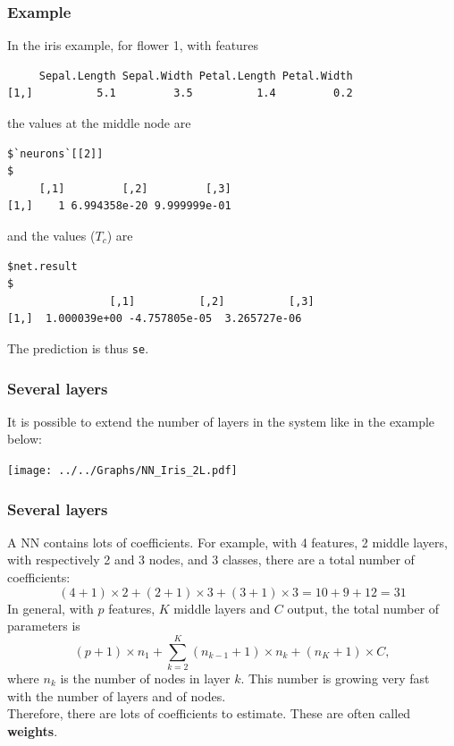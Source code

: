 \begin{frame}[fragile]
\frametitle{Example}
In the iris example, for flower 1, with features\\
\scriptsize
\begin{verbatim}
     Sepal.Length Sepal.Width Petal.Length Petal.Width
[1,]          5.1         3.5          1.4         0.2
\end{verbatim}
\normalsize
the values at the middle node are\\
\scriptsize
\begin{verbatim}
$`neurons`[[2]]                                                                         $
     [,1]         [,2]         [,3]
[1,]    1 6.994358e-20 9.999999e-01
\end{verbatim}
\normalsize
and the values ($T_c$) are\\ 
\scriptsize
\begin{verbatim}
$net.result                                                                            $
                [,1]          [,2]          [,3]
[1,]  1.000039e+00 -4.757805e-05  3.265727e-06
\end{verbatim}
\normalsize
The prediction is thus {\tt se}. 
\end{frame}
\begin{frame}
\frametitle{Several layers}
It is possible to extend the number of layers in the system like in the example below:
\begin{center}
\texttt{[image: ../../Graphs/NN\_Iris\_2L.pdf]}
\end{center}
\end{frame}
\begin{frame}
\frametitle{Several layers}
A NN contains lots of coefficients. For example, with 4 features, 2 middle layers, with respectively 2 and 3 nodes, and 3 classes, there are a total number of coefficients:
$$
(4+1)\times 2 + (2+1)\times 3 + (3+1) \times 3 = 10+9+12 = 31
$$
In general, with $p$ features, $K$ middle layers and $C$ output, the total number of parameters is
$$
(p+1)\times n_1 + \sum_{k=2}^K (n_{k-1}+1) \times n_k + (n_K+1)\times C,
$$
where $n_k$ is the number of nodes in layer $k$. This number is growing very fast with the number of layers and of nodes.\\
\vspace{0.2cm} 
Therefore, there are lots of coefficients to estimate. These are often called {\bf weights}.
\end{frame}
